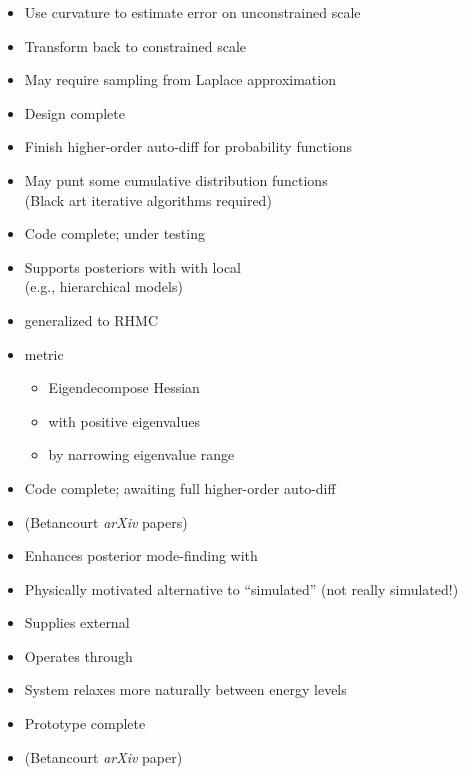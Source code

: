 \documentclass[10pt]{report}
\newcommand{\sld}[1]{\newpage{\noindent\LARGE \ \ \
    \textcolor{MidnightBlue}{\bfseries #1}}\vspace*{4pt}}
\newcommand{\myemph}[1]{{\color{MidnightBlue}{\bfseries #1}}}
\begin{document}
\sld{MLE/MML Error Estimation}
\begin{itemize}
\item Use curvature to estimate error on unconstrained scale
\item Transform back to constrained scale 
\item May require sampling from Laplace approximation
\vfill
\item Design complete
\end{itemize}


\sld{Higher-Order Auto-diff}
\begin{itemize}
\item Finish higher-order auto-diff for probability functions
\item May punt some cumulative distribution functions
\\
{\footnotesize (Black art iterative algorithms required)}
\vfill
\item Code complete; under testing
\end{itemize}


\sld{Riemannian Manifold HMC}
\begin{itemize}
\item Supports posteriors with \myemph{position-dependent
    curvature} with local \myemph{mass matrix estimation}
\\
  {\small (e.g., hierarchical models)}
\item \myemph{NUTS} generalized to RHMC
\item \myemph{SoftAbs} metric
\vspace*{-4pt}
\begin{itemize}\footnotesize
\item Eigendecompose Hessian
\item \myemph{positive definite} with positive eigenvalues
\item \myemph{condition} by narrowing eigenvalue range
\end{itemize}
\vfill
\item Code complete; awaiting full higher-order auto-diff
\item {\small (Betancourt {\slshape arXiv} papers)}
\end{itemize}

\sld{Thermodynamic Sampler}
\begin{itemize}
\item Enhances posterior mode-finding with \myemph{multiple modes}
\item Physically motivated alternative to ``simulated''
  \myemph{annealing and tempering} (not really simulated!)
\item Supplies external \myemph{heat bath}
\item Operates through \myemph{contact manifold}
\item System relaxes more naturally between energy levels
\vfill
\item Prototype complete
\item {\small (Betancourt {\slshape arXiv} paper)}
\end{itemize}
\end{document}
